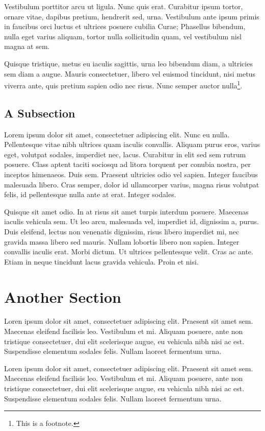 Vestibulum porttitor arcu ut ligula. Nunc quis
erat. Curabitur ipsum tortor, ornare vitae, dapibus pretium, hendrerit
sed, urna. Vestibulum ante ipsum primis in faucibus orci luctus et
ultrices posuere cubilia Curae; Phasellus bibendum, nulla eget varius
aliquam, tortor nulla sollicitudin quam, vel vestibulum nisl magna at
sem.

Quisque tristique, metus eu iaculis
sagittis, urna leo bibendum diam, a ultricies sem diam a augue. Mauris
consectetuer, libero vel euismod tincidunt, nisi metus viverra ante,
quis pretium sapien odio nec risus. Nunc semper auctor
nulla\footnote{This is a footnote.}. 

\subsection{A Subsection} \label{batik} 

Lorem ipsum dolor sit amet, consectetuer adipiscing elit. Nunc eu
nulla. Pellentesque vitae nibh ultrices quam iaculis
convallis. Aliquam purus eros, varius eget, volutpat sodales,
imperdiet nec, lacus. Curabitur in elit sed sem rutrum posuere. Class
aptent taciti sociosqu ad litora torquent per conubia nostra, per
inceptos himenaeos. Duis sem. Praesent ultricies odio vel
sapien. Integer faucibus malesuada libero. Cras semper, dolor id
ullamcorper varius, magna risus volutpat felis, id pellentesque nulla
ante at erat. Integer sodales. 

Quisque sit amet odio. In at risus sit amet turpis interdum
posuere. Maecenas iaculis vehicula sem. Ut leo arcu, malesuada vel,
imperdiet id, dignissim a, purus. Duis eleifend, lectus non venenatis
dignissim, risus libero imperdiet mi, nec gravida massa libero sed
mauris. Nullam lobortis libero non sapien. Integer convallis iaculis
erat. Morbi dictum. Ut ultrices pellentesque velit. Cras ac
ante. Etiam in neque tincidunt lacus gravida vehicula. Proin et nisi. 

\section{Another Section}

Loren ipsum dolor sit amet, consectetuer adipiscing elit. 
Praesent sit amet sem. Maecenas eleifend facilisis leo. Vestibulum et
mi. Aliquam posuere, ante non tristique consectetuer, dui elit
scelerisque augue, eu vehicula nibh nisi ac est. Suspendisse elementum
sodales felis. Nullam laoreet fermentum urna. 

Loren ipsum dolor sit amet, consectetuer adipiscing elit. 
Praesent sit amet sem. Maecenas eleifend facilisis leo. Vestibulum et
mi. Aliquam posuere, ante non tristique consectetuer, dui elit
scelerisque augue, eu vehicula nibh nisi ac est. Suspendisse elementum
sodales felis. Nullam laoreet fermentum urna. 

